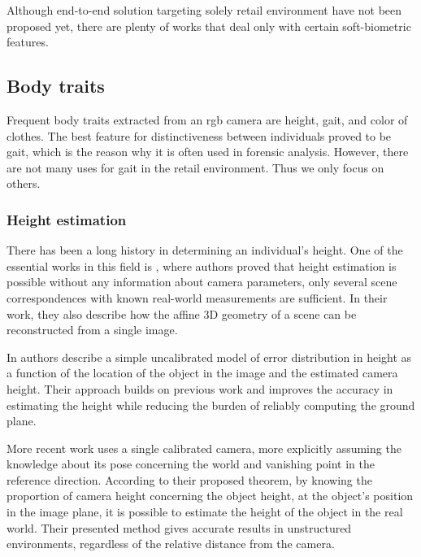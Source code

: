     Although end-to-end solution targeting solely retail environment have not been proposed yet, there are plenty of works that deal only with certain soft-biometric features.
   
    \subsection{Body traits}
        Frequent body traits \cite{de2018comparative} extracted from an \gls{rgb} camera are height, gait, and color of clothes. The best feature for distinctiveness between individuals proved to be gait, which is the reason why it is often used in forensic analysis. However, there are not many uses for gait in the retail environment. Thus we only focus on others.
        
        \subsubsection{Height estimation}
            There has been a long history in determining an individual's height. One of the essential works in this field is \cite{criminisi2002single}, where authors proved that height estimation is possible without any information about camera parameters, only several scene correspondences with known real-world measurements are sufficient. In their work, they also describe how the affine 3D geometry of a scene can be reconstructed from a single image.
            
            In \cite{viswanath2009simplified} authors describe a simple uncalibrated model of error distribution in height as a function of the location of the object in the image and the estimated camera height. Their approach builds on previous work \cite{criminisi2002single} and improves the accuracy in estimating the height while reducing the burden of reliably computing the ground plane. 
        
            More recent work \cite{momeni2012height} uses a single calibrated camera, more explicitly assuming the knowledge about its pose concerning the world and vanishing point in the reference direction. According to their proposed theorem, by knowing the proportion of camera height concerning the object height, at the object’s position in the image plane, it is possible to estimate the height of the object in the real world. Their presented method gives accurate results in unstructured environments, regardless of the relative distance from the camera.
            
